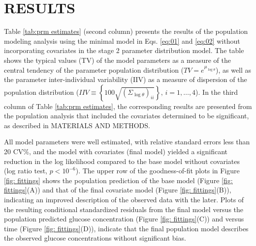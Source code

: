 \documentclass[utf8]{frontiersSCNS} %
\begin{document}
\vskip 0.5cm
\section{RESULTS}
\vskip 0.5cm
Table \ref{tab:prm estimates} (second column) presents the results of the population modeling analysis using the minimal model in Eqs. \ref{eq:01} and \ref{eq:02} without incorporating covariates in the stage 2 parameter distribution model. The table shows the typical values (TV) of the model parameters as a measure of the central tendency of the parameter population distribution ($TV = {e^{{\mu _{\log \theta }}}}$), as well as the parameter inter-individual variability (IIV) as a measure of dispersion of the population distribution ($IIV \equiv \left\{ {100\sqrt {{{\left( {{\Sigma _{\log \theta }}} \right)}_{ii}}} } \right\},\,i = 1, \ldots ,4$). In the third column of Table \ref{tab:prm estimates}, the corresponding results are presented from the population analysis that included the covariates determined to be significant, as described in MATERIALS AND METHODS.

All model parameters were well estimated, with relative standard errors less than 20 CV\%, and the model with covariates (final model) yielded a significant reduction in the log likelihood compared to the base model without covariates (log ratio test, $p<10^{-6}$). The upper row of the goodness-of-fit plots in Figure \ref{fig: fittings} shows the population prediction of the base model (Figure \ref{fig: fittings}(A)) and that of the final covariate model (Figure \ref{fig: fittings}(B)), indicating an improved description of the observed data with the later. Plots of the resulting conditional standardized residuals from the final model versus the population predicted glucose concentration (Figure \ref{fig: fittings}(C)) and versus time (Figure \ref{fig: fittings}(D)), indicate that the final population model describes the observed glucose concentrations without significant bias.

\vskip 1.0cm
\end{document}
